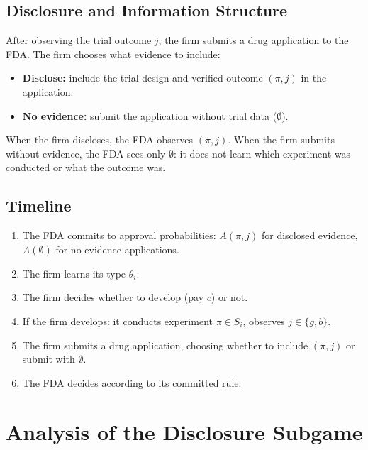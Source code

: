\documentclass[12pt,a4paper]{article}
\begin{document}
\subsection{Disclosure and Information Structure}
\label{sec:modification}

After observing the trial outcome $j$, the firm submits a
drug application to the FDA. The firm chooses what evidence to
include:
\begin{itemize}
  \item \textbf{Disclose:} include the trial design and
    verified outcome $(\pi, j)$ in the application.
  \item \textbf{No evidence:} submit the application without
    trial data ($\emptyset$).
\end{itemize}

When the firm discloses, the FDA observes $(\pi, j)$. When
the firm submits without evidence, the FDA sees only
$\emptyset$: it does not learn which experiment was conducted
or what the outcome was.


\subsection{Timeline}
\label{sec:timeline}

\begin{enumerate}
  \item The FDA commits to approval probabilities:
    $A(\pi, j)$ for disclosed evidence, $A(\emptyset)$ for
    no-evidence applications.
  \item The firm learns its type $\theta_i$.
  \item The firm decides whether to develop (pay $c$) or not.
  \item If the firm develops: it conducts experiment
    $\pi \in S_i$, observes $j \in \{g, b\}$.
  \item The firm submits a drug application, choosing
    whether to include $(\pi, j)$ or submit with $\emptyset$.
  \item The FDA decides according to its committed rule.
\end{enumerate}


\section{Analysis of the Disclosure Subgame}
\label{sec:disclosure}
\end{document}
